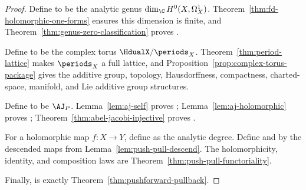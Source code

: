 \begin{proof}\leanok
Define  to be the analytic genus
\(\dim_{\C}H^{0}(X,\Omega^{1}_{X})\). Theorem~\ref{thm:fd-holomorphic-one-forms}
ensures this dimension is finite, and Theorem~\ref{thm:genus-zero-classification}
proves .

Define  to be the complex torus
\(\HdualX/\periods_X\). Theorem~\ref{thm:period-lattice} makes
\(\periods_X\) a full lattice, and Proposition~\ref{prop:complex-torus-package}
gives the additive group, topology, Hausdorffness, compactness, charted-space,
manifold, and Lie additive group structures.

Define  to be \(\AJ_P\). Lemma~\ref{lem:aj-self}
proves ; Lemma~\ref{lem:aj-holomorphic} proves
; Theorem~\ref{thm:abel-jacobi-injective} proves
.

For a holomorphic map \(f:X\to Y\), define  as
the analytic degree. Define  and
 by the descended maps from
Lemma~\ref{lem:push-pull-descend}. The holomorphicity, identity, and
composition laws are Theorem~\ref{thm:push-pull-functoriality}.

Finally,  is exactly
Theorem~\ref{thm:pushforward-pullback}.
\end{proof}
